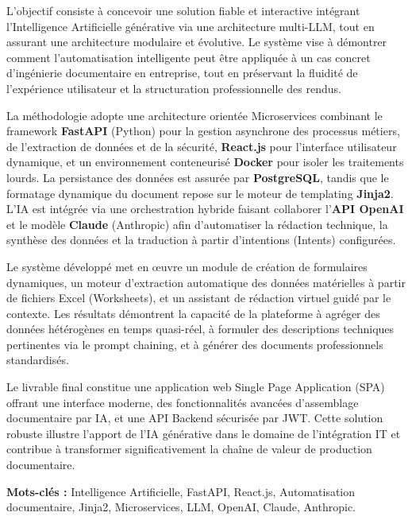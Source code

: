 \documentclass[12pt, a4paper]{report}
\begin{document}
L’objectif consiste à concevoir une solution fiable et interactive intégrant l'Intelligence Artificielle générative via une architecture multi-LLM, tout en assurant une architecture modulaire et évolutive. Le système vise à démontrer comment l’automatisation intelligente peut être appliquée à un cas concret d'ingénierie documentaire en entreprise, tout en préservant la fluidité de l'expérience utilisateur et la structuration professionnelle des rendus.

La méthodologie adopte une architecture orientée Microservices combinant le framework \textbf{FastAPI} (Python) pour la gestion asynchrone des processus métiers, de l'extraction de données et de la sécurité, \textbf{React.js} pour l'interface utilisateur dynamique, et un environnement conteneurisé \textbf{Docker} pour isoler les traitements lourds. La persistance des données est assurée par \textbf{PostgreSQL}, tandis que le formatage dynamique du document repose sur le moteur de templating \textbf{Jinja2}. L'IA est intégrée via une orchestration hybride faisant collaborer l'\textbf{API OpenAI} et le modèle \textbf{Claude} (Anthropic) afin d'automatiser la rédaction technique, la synthèse des données et la traduction à partir d'intentions (Intents) configurées.

Le système développé met en œuvre un module de création de formulaires dynamiques, un moteur d'extraction automatique des données matérielles à partir de fichiers Excel (Worksheets), et un assistant de rédaction virtuel guidé par le contexte. Les résultats démontrent la capacité de la plateforme à agréger des données hétérogènes en temps quasi-réel, à formuler des descriptions techniques pertinentes via le prompt chaining, et à générer des documents professionnels standardisés.

Le livrable final constitue une application web Single Page Application (SPA) offrant une interface moderne, des fonctionnalités avancées d'assemblage documentaire par IA, et une API Backend sécurisée par JWT. Cette solution robuste illustre l’apport de l'IA générative dans le domaine de l'intégration IT et contribue à transformer significativement la chaîne de valeur de production documentaire.

\vspace{0.5cm}
\textbf{Mots-clés :} Intelligence Artificielle, FastAPI, React.js, Automatisation documentaire, Jinja2, Microservices, LLM, OpenAI, Claude, Anthropic.

\end{document}
